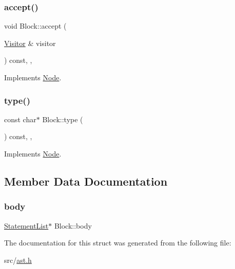 \subsubsection{\texorpdfstring{accept()}{accept()}}
{\footnotesize\ttfamily void Block\+::accept (\begin{DoxyParamCaption}\item[{\hyperlink{struct_visitor}{Visitor} \&}]{visitor }\end{DoxyParamCaption}) const\hspace{0.3cm}{\ttfamily [inline]}, {\ttfamily [override]}, {\ttfamily [virtual]}}



Implements \hyperlink{struct_node_a10bd7af968140bbf5fa461298a969c71}{Node}.

\mbox{\label{struct_block_a0a495712f07ce103494469c87a8352c2}} 
\subsubsection{\texorpdfstring{type()}{type()}}
{\footnotesize\ttfamily const char$\ast$ Block\+::type (\begin{DoxyParamCaption}{ }\end{DoxyParamCaption}) const\hspace{0.3cm}{\ttfamily [inline]}, {\ttfamily [override]}, {\ttfamily [virtual]}}



Implements \hyperlink{struct_node_a82f29420d0a38efcc370352528e94e9b}{Node}.



\subsection{Member Data Documentation}
\mbox{\label{struct_block_a05207097167e9263252079d78f3d9358}} 
\subsubsection{\texorpdfstring{body}{body}}
{\footnotesize\ttfamily \hyperlink{struct_statement_list}{Statement\+List}$\ast$ Block\+::body}



The documentation for this struct was generated from the following file\+:\begin{DoxyCompactItemize}
\item 
src/\hyperlink{ast_8h}{ast.\+h}\end{DoxyCompactItemize}
